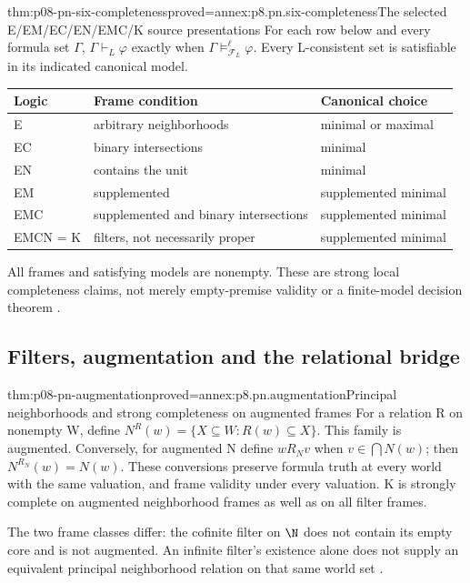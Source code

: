 \begin{hbtheorem}{thm:p08-pn-six-completeness}{proved=annex:p8.pn.six-completeness}{The selected E/EM/EC/EN/EMC/K source presentations}
For each row below and every formula set \(\Gamma\),
\(\Gamma\vdash_L\varphi\) exactly when
\(\Gamma\models^{\ell}_{\mathscr F_L}\varphi\).
Every L-consistent set is satisfiable in its indicated canonical model.
\begin{center}\small
\begin{tabular}{@{}lll@{}}
\toprule
Logic & Frame condition & Canonical choice \\
\midrule
E & arbitrary neighborhoods & minimal or maximal \\
EC & binary intersections & minimal \\
EN & contains the unit & minimal \\
EM & supplemented & supplemented minimal \\
EMC & supplemented and binary intersections & supplemented minimal \\
EMCN = K & filters, not necessarily proper & supplemented minimal \\
\bottomrule
\end{tabular}
\end{center}
All frames and satisfying models are nonempty. These are strong local
completeness claims, not merely empty-premise validity or a finite-model
decision theorem \cite[thms.~2.38--2.42, ex.~2.20]{Pacuit2017}.
\end{hbtheorem}

\subsection{Filters, augmentation and the relational bridge}

\begin{hbtheorem}{thm:p08-pn-augmentation}{proved=annex:p8.pn.augmentation}{Principal neighborhoods and strong completeness on augmented frames}
For a relation R on nonempty W, define
\(N^R(w)=\{X\subseteq W:R(w)\subseteq X\}\). This family
is augmented. Conversely, for augmented N define
\(wR_Nv\) when \(v\in\bigcap N(w)\); then
\(N^{R_N}(w)=N(w)\). These conversions preserve formula truth
at every world with the same valuation, and frame validity under
every valuation. K is strongly complete on augmented neighborhood
frames as well as on all filter frames.

The two frame classes differ: the cofinite filter on \(\N\)
does not contain its empty core and is not augmented. An infinite
filter's existence alone does not supply an equivalent principal
neighborhood relation on that same world set
\cite[\S2.2.1, ex.~2.21]{Pacuit2017}.
\end{hbtheorem}

